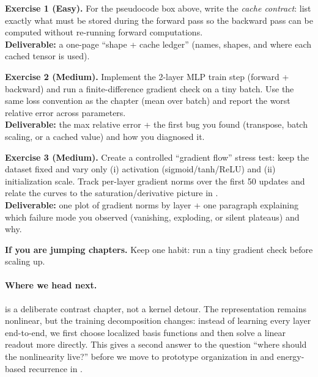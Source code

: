 \begin{tcolorbox}[summarybox, title={Exercises}]
\textbf{Exercise 1 (Easy).} For the pseudocode box above, write the \emph{cache contract}: list exactly what must be stored during the forward pass so the backward pass can be computed without re-running forward computations. \\
\textbf{Deliverable:} a one-page ``shape + cache ledger'' (names, shapes, and where each cached tensor is used).

\smallskip
\textbf{Exercise 2 (Medium).} Implement the 2-layer MLP train step (forward + backward) and run a finite-difference gradient check on a tiny batch. Use the same loss convention as the chapter (mean over batch) and report the worst relative error across parameters. \\
\textbf{Deliverable:} the max relative error + the first bug you found (transpose, batch scaling, or a cached value) and how you diagnosed it.

\smallskip
\textbf{Exercise 3 (Medium).} Create a controlled ``gradient flow'' stress test: keep the dataset fixed and vary only (i) activation (sigmoid/tanh/ReLU) and (ii) initialization scale. Track per-layer gradient norms over the first 50 updates and relate the curves to the saturation/derivative picture in . \\
\textbf{Deliverable:} one plot of gradient norms by layer + one paragraph explaining which failure mode you observed (vanishing, exploding, or silent plateaus) and why.
    \end{tcolorbox}
    \medskip
    \noindent\textbf{If you are jumping chapters.} Keep one habit: run a tiny gradient check before scaling up.

    \medskip
    \paragraph{Where we head next.}  is a deliberate contrast chapter, not a kernel detour. The representation remains nonlinear, but the training decomposition changes: instead of learning every layer end-to-end, we first choose localized basis functions and then solve a linear readout more directly. This gives a second answer to the question ``where should the nonlinearity live?'' before we move to prototype organization in  and energy-based recurrence in .

    \nocite{Rumelhart1986, Haykin2009}
